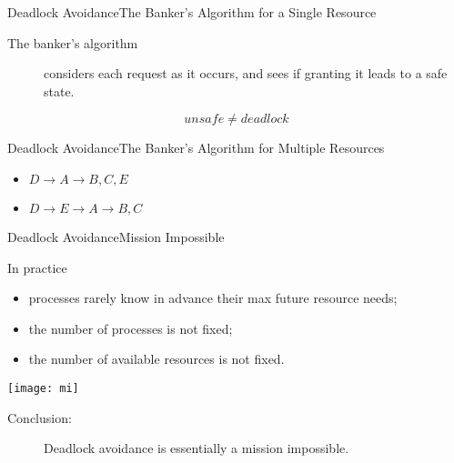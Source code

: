 \begin{frame}{Deadlock Avoidance}{The Banker's Algorithm for a Single Resource}
  \begin{description}
  \item[The banker's algorithm] considers each request as it occurs, and sees if granting
    it leads to a safe state.
  \end{description}
  \begin{center}
  \end{center}
  $$unsafe \neq deadlock$$
\end{frame}

\begin{frame}{Deadlock Avoidance}{The Banker's Algorithm for Multiple Resources}
  \begin{center}
  \end{center}
  \begin{itemize}
  \item[] $ D\rightarrow{}A\rightarrow{}B,C,E$
  \item[] $ D\rightarrow{}E\rightarrow{}A\rightarrow{}B,C$
  \end{itemize}
\end{frame}

\begin{frame}{Deadlock Avoidance}{Mission Impossible}
  \begin{minipage}{.6\linewidth}
    \begin{block}{In practice}
      \begin{itemize}
      \item processes rarely know in advance their max future resource
        needs;
      \item the number of processes is not fixed;
      \item the number of available resources is not fixed.
      \end{itemize}
    \end{block}
  \end{minipage}\qquad
  \begin{minipage}{.3\linewidth}
    \texttt{[image: mi]}
  \end{minipage}
  \begin{description}
  \item[Conclusion:] Deadlock avoidance is essentially a mission
    impossible.
  \end{description}
\end{frame}

